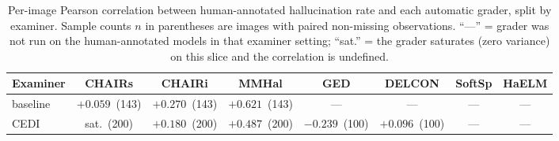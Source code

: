 \begin{table}[h]
\centering
\scriptsize
\setlength{\tabcolsep}{3pt}
\caption{Per-image Pearson correlation between human-annotated hallucination
rate and each automatic grader, split by examiner. Sample counts $n$ in
parentheses are images with paired non-missing observations. ``---'' = grader
was not run on the human-annotated models in that examiner setting; ``sat.''
= the grader saturates (zero variance) on this slice and the correlation is
undefined.}
\label{tab:human-grader-corr}
\begin{tabular}{l|ccccccc}
\toprule
\textbf{Examiner} & \textbf{CHAIRs} & \textbf{CHAIRi} & \textbf{MMHal} & \textbf{GED} & \textbf{DELCON} & \textbf{SoftSp} & \textbf{HaELM} \\
\midrule
baseline & $+0.059$ \,\scriptsize(143) & $+0.270$ \,\scriptsize(143) & $+0.621$ \,\scriptsize(143) & --- & --- & --- & --- \\
CEDI & sat. \,\scriptsize(200) & $+0.180$ \,\scriptsize(200) & $+0.487$ \,\scriptsize(200) & $-0.239$ \,\scriptsize(100) & $+0.096$ \,\scriptsize(100) & --- & --- \\
\bottomrule
\end{tabular}
\end{table}
